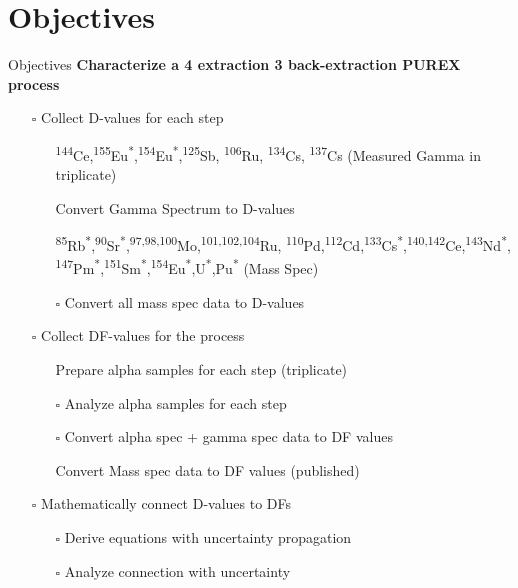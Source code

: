\documentclass{beamer}
\newcommand{\tss}{\textsuperscript}
\newcommand{\cmark}{\ding{51}}%
\newcommand{\done}{\rlap{$\square$}{\raisebox{2pt}{\large\hspace{1pt}\cmark}}%
  \hspace{-2.5pt}}
\newcommand{\notdone}{$\square$}
\begin{document}
\section{Objectives}
\begin{frame}[allowframebreaks]{Objectives}
\vspace{-0.7cm}
\textbf{\small Characterize a 4 extraction 3 back-extraction PUREX process}
\begin{itemize}
\item[\notdone]{Collect D-values for each step}
  \begin{itemize}
  \item[\tiny\done]{\tiny \tss{144}Ce,\tss{155}Eu\tss{*},\tss{154}Eu\tss{*},\tss{125}Sb,
    \tss{106}Ru, \tss{134}Cs, \tss{137}Cs (Measured Gamma in triplicate)}
  \item[\tiny\done]{\tiny Convert Gamma Spectrum to D-values}
  \item[\tiny\done]{\tiny \tss{85}Rb\tss{*},\tss{90}Sr\tss{*},\tss{97,98,100}Mo,\tss{101,102,104}Ru,
    \tss{110}Pd,\tss{112}Cd,\tss{133}Cs\tss{*},\tss{140,142}Ce,\tss{143}Nd\tss{*},
    \tss{147}Pm\tss{*},\tss{151}Sm\tss{*},\tss{154}Eu\tss{*},U\tss{*},Pu\tss{*} (Mass Spec)}
  \item[\tiny\notdone]{\tiny Convert all mass spec data to D-values}
  \end{itemize}
\item[\notdone]{Collect DF-values for the process}
  \begin{itemize}
  \item[\tiny\done]{\tiny Prepare alpha samples for each step (triplicate)}
  \item[\tiny\notdone]{\tiny Analyze alpha samples for each step}
  \item[\tiny\notdone]{\tiny Convert alpha spec + gamma spec data to DF values}
  \item[\tiny\done]{\tiny Convert Mass spec data to DF values (published)}
  \end{itemize}
\item[\notdone]{Mathematically connect D-values to DFs}
  \begin{itemize}
  \item[\tiny\notdone]{\tiny Derive equations with uncertainty propagation}
  \item[\tiny\notdone]{\tiny Analyze connection with uncertainty}
  \end{itemize}
\end{itemize}
\framebreak
\vspace*{-1cm}

\end{frame}
\end{document}
